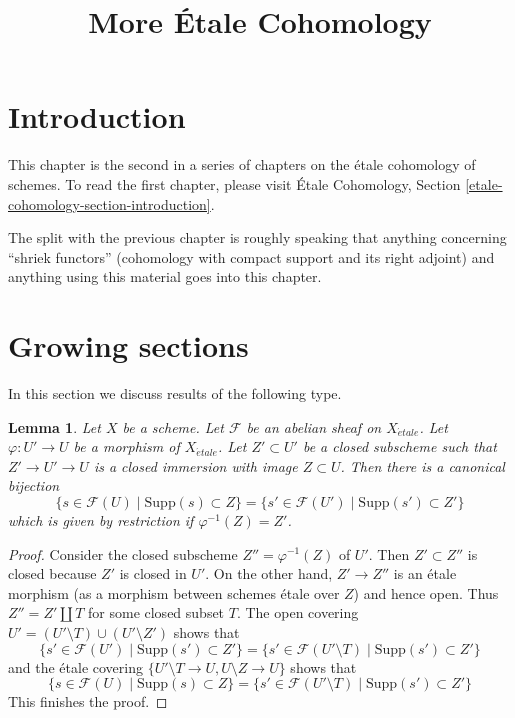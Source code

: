 \documentclass{stacks-project}
\theoremstyle{plain}
\newtheorem{lemma}[subsection]{Lemma}
\theoremstyle{definition}
\theoremstyle{remark}
\numberwithin{equation}{subsection}
\def\etale{{\acute{e}tale}}
\begin{document}
\title{More \'Etale Cohomology}


\maketitle

\label{section-phantom}

\tableofcontents


\section{Introduction}
\label{section-introduction}

\noindent
This chapter is the second in a series of chapters on the \'etale cohomology
of schemes. To read the first chapter, please visit
\'Etale Cohomology, Section \ref{etale-cohomology-section-introduction}.

\medskip\noindent
The split with the previous chapter is roughly speaking that anything
concerning ``shriek functors'' (cohomology with compact support and
its right adjoint) and anything using this material goes into this chapter.






\section{Growing sections}
\label{section-growing}

\noindent
In this section we discuss results of the following type.

\begin{lemma}
\label{lemma-section-support-in-locally-closed-pre}
Let $X$ be a scheme. Let $\mathcal{F}$ be an abelian sheaf on $X_\etale$.
Let $\varphi : U' \to U$ be a morphism of $X_\etale$. Let $Z' \subset U'$ be a
closed subscheme such that $Z' \to U' \to U$ is a closed immersion
with image $Z \subset U$. Then there is a canonical bijection
$$
\{s \in \mathcal{F}(U) \mid \text{Supp}(s) \subset Z\} =
\{s' \in \mathcal{F}(U') \mid \text{Supp}(s') \subset Z'\}
$$
which is given by restriction if $\varphi^{-1}(Z) = Z'$.
\end{lemma}

\begin{proof}
Consider the closed subscheme $Z'' = \varphi^{-1}(Z)$ of $U'$.
Then $Z' \subset Z''$ is closed because $Z'$ is closed in $U'$.
On the other hand, $Z' \to Z''$ is an \'etale morphism
(as a morphism between schemes \'etale over $Z$) and hence
open. Thus $Z'' = Z' \amalg T$ for some closed subset $T$.
The open covering $U' = (U' \setminus T) \cup (U' \setminus Z')$
shows that
$$
\{s' \in \mathcal{F}(U') \mid \text{Supp}(s') \subset Z'\} =
\{s' \in \mathcal{F}(U' \setminus T) \mid \text{Supp}(s') \subset Z'\}
$$
and the \'etale covering $\{U' \setminus T \to U, U \setminus Z \to U\}$
shows that
$$
\{s \in \mathcal{F}(U) \mid \text{Supp}(s) \subset Z\} =
\{s' \in \mathcal{F}(U' \setminus T) \mid \text{Supp}(s') \subset Z'\}
$$
This finishes the proof.
\end{proof}
\end{document}

